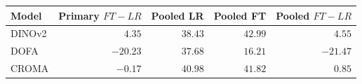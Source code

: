 \begin{tabular}{lrrrr}
\hline
Model & Primary $FT-LR$ & Pooled LR & Pooled FT & Pooled $FT-LR$ \\
\hline
DINOv2 & $4.35$ & $38.43$ & $42.99$ & $4.55$ \\
DOFA & $-20.23$ & $37.68$ & $16.21$ & $-21.47$ \\
CROMA & $-0.17$ & $40.98$ & $41.82$ & $0.85$ \\
\hline
\end{tabular}
